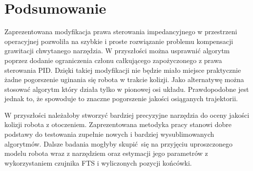 
\chapter{Podsumowanie\label{chap:podsumowanie}}

Zaprezentowana modyfikacja prawa sterowania impedancyjnego w przestrzeni operacyjnej pozwoliła na szybkie i proste rozwiązanie problemu kompensacji grawitacji chwytanego narzędzia. W przyszłości można usprawnić algorytm poprzez dodanie ograniczenia członu całkującego zapożyczonego z prawa sterowania PID. Dzięki takiej modyfikacji nie będzie miało miejsce praktycznie żadne pogorszenie uginania się robota w trakcie kolizji. Jako alternatywę można stosować algorytm który działa tylko w pionowej osi układu. Prawdopodobne jest jednak to, że spowoduje to znaczne pogorszenie jakości osiąganych trajektorii. 

W przyszłości należałoby stworzyć bardziej precyzyjne narzędzia do oceny jakości kolizji robota z otoczeniem.  Zaprezentowana metodyka pracy stanowi dobre podstawy do testowania zupełnie nowych i bardziej wysublimowanych algorytmów.  Dalsze badania mogłyby skupić się na przyjęciu uproszczonego modelu robota wraz z narzędziem oraz estymacji jego parametrów z wykorzystaniem czujnika FTS i wyliczonych pozycji końcówki.